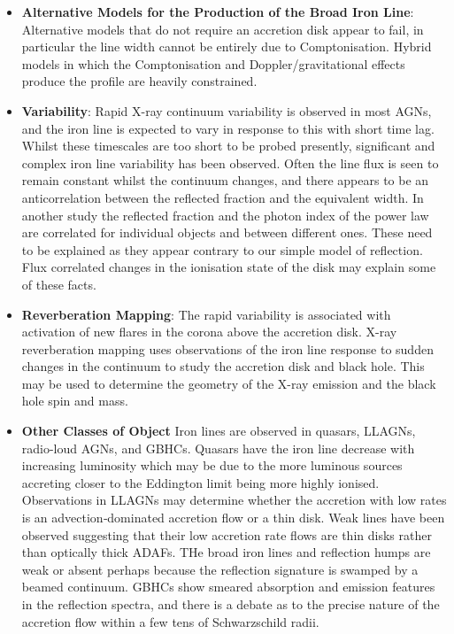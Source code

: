 \documentclass[
  letterpaper,
  DIV=11,
  numbers=noendperiod]{scrreprt}
\begin{document}
\begin{tcolorbox}
\begin{itemize}
  \textbf{Black Hole Spin}: The radius of the ISCO decreases with spin.
  Since the line profile is sensitive to the innermost radius of
  fluorescent emission this may be used to estimate the black hole, with
  some astrophysical assumptions. With present time-averaged
  observations such measurements may be ambiguous as alternative models
  with different values for the spin may produce identical line
  profiles.
\item
  \textbf{Alternative Models for the Production of the Broad Iron Line}:
  Alternative models that do not require an accretion disk appear to
  fail, in particular the line width cannot be entirely due to
  Comptonisation. Hybrid models in which the Comptonisation and
  Doppler/gravitational effects produce the profile are heavily
  constrained.
\item
  \textbf{Variability}: Rapid X-ray continuum variability is observed in
  most AGNs, and the iron line is expected to vary in response to this
  with short time lag. Whilst these timescales are too short to be
  probed presently, significant and complex iron line variability has
  been observed. Often the line flux is seen to remain constant whilst
  the continuum changes, and there appears to be an anticorrelation
  between the reflected fraction and the equivalent width. In another
  study the reflected fraction and the photon index of the power law are
  correlated for individual objects and between different ones. These
  need to be explained as they appear contrary to our simple model of
  reflection. Flux correlated changes in the ionisation state of the
  disk may explain some of these facts.
\item
  \textbf{Reverberation Mapping}: The rapid variability is associated
  with activation of new flares in the corona above the accretion disk.
  X-ray reverberation mapping uses observations of the iron line
  response to sudden changes in the continuum to study the accretion
  disk and black hole. This may be used to determine the geometry of the
  X-ray emission and the black hole spin and mass.
\item
  \textbf{Other Classes of Object} Iron lines are observed in quasars,
  LLAGNs, radio-loud AGNs, and GBHCs. Quasars have the iron line
  decrease with increasing luminosity which may be due to the more
  luminous sources accreting closer to the Eddington limit being more
  highly ionised. Observations in LLAGNs may determine whether the
  accretion with low rates is an advection‐dominated accretion flow or a
  thin disk. Weak lines have been observed suggesting that their low
  accretion rate flows are thin disks rather than optically thick ADAFs.
  THe broad iron lines and reflection humps are weak or absent perhaps
  because the reflection signature is swamped by a beamed continuum.
  GBHCs show smeared absorption and emission features in the reflection
  spectra, and there is a debate as to the precise nature of the
  accretion flow within a few tens of Schwarzschild radii.
\end{itemize}

\end{tcolorbox}
\end{document}
